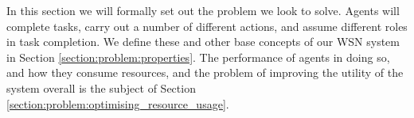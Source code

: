 
In this section we will formally set out the problem we look to solve.  Agents will complete tasks, carry out a number of different actions, and assume different roles in task completion. We define these and other base concepts of our WSN system in Section \ref{section:problem:properties}. The performance of agents in doing so, and how they consume resources, and the problem of improving the utility of the system overall is the subject of Section \ref{section:problem:optimising_resource_usage}.